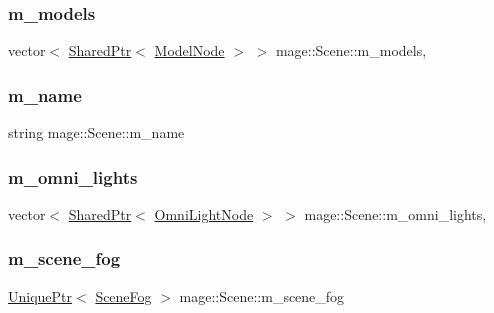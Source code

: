 \subsubsection{\texorpdfstring{m\+\_\+models}{m\_models}}
{\footnotesize\ttfamily vector$<$ \hyperlink{namespacemage_a1e01ae66713838a7a67d30e44c67703e}{Shared\+Ptr}$<$ \hyperlink{classmage_1_1_model_node}{Model\+Node} $>$ $>$ mage\+::\+Scene\+::m\+\_\+models\hspace{0.3cm}{\ttfamily [mutable]}, {\ttfamily [private]}}

\hypertarget{classmage_1_1_scene_a6cc8cb08b1853c4e3063b33a94e8fb47}{}\label{classmage_1_1_scene_a6cc8cb08b1853c4e3063b33a94e8fb47} 
\subsubsection{\texorpdfstring{m\+\_\+name}{m\_name}}
{\footnotesize\ttfamily string mage\+::\+Scene\+::m\+\_\+name\hspace{0.3cm}{\ttfamily [private]}}

\hypertarget{classmage_1_1_scene_a881c3dd7e85e5069650f29fd2722bf78}{}\label{classmage_1_1_scene_a881c3dd7e85e5069650f29fd2722bf78} 
\subsubsection{\texorpdfstring{m\+\_\+omni\+\_\+lights}{m\_omni\_lights}}
{\footnotesize\ttfamily vector$<$ \hyperlink{namespacemage_a1e01ae66713838a7a67d30e44c67703e}{Shared\+Ptr}$<$ \hyperlink{namespacemage_a1724c6e6b6b5ba535cdd967cbbb4a669}{Omni\+Light\+Node} $>$ $>$ mage\+::\+Scene\+::m\+\_\+omni\+\_\+lights\hspace{0.3cm}{\ttfamily [mutable]}, {\ttfamily [private]}}

\hypertarget{classmage_1_1_scene_a58f8d29322664c4c5895703a6cbc9000}{}\label{classmage_1_1_scene_a58f8d29322664c4c5895703a6cbc9000} 
\subsubsection{\texorpdfstring{m\+\_\+scene\+\_\+fog}{m\_scene\_fog}}
{\footnotesize\ttfamily \hyperlink{namespacemage_a3316d7143a973e37adf1110f2e80ca31}{Unique\+Ptr}$<$ \hyperlink{classmage_1_1_scene_fog}{Scene\+Fog} $>$ mage\+::\+Scene\+::m\+\_\+scene\+\_\+fog\hspace{0.3cm}{\ttfamily [private]}}

